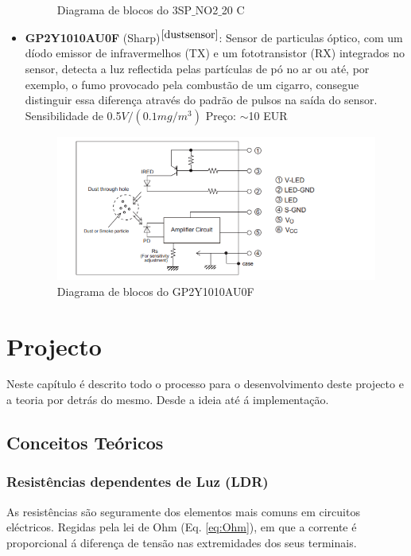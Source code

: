 \documentclass[12pt]{article}
\begin{document}
\begin{itemize}
\begin{figure}[H]
        \caption{Diagrama de blocos do 3SP$\_$NO2$\_$20 C}
    \end{figure}
    \item \textbf{GP2Y1010AU0F} (Sharp)$^{\cite{dustsensor}}$: Sensor de particulas óptico, com um díodo emissor de infravermelhos (TX) e um fototransistor (RX) integrados no sensor, detecta a luz reflectida pelas partículas de pó no ar ou até, por exemplo, o fumo provocado pela combustão de um cigarro, consegue distinguir essa diferença através do padrão de pulsos na saída do sensor. Sensibilidade de 0.5$V/(0.1mg/m^3)$ Preço: $\sim$10 EUR
    \begin{figure}[H]
        \centering
        \includegraphics[width=0.6\linewidth]{imgs/dust.png}
        \caption{Diagrama de blocos do GP2Y1010AU0F}
    \end{figure}
\end{itemize}


\section{Projecto}

\par Neste capítulo é descrito todo o processo para o desenvolvimento deste projecto e a teoria por detrás do mesmo. Desde a ideia até á implementação.

\subsection{Conceitos Teóricos}
\subsubsection{Resistências dependentes de Luz (LDR)}

\par As resistências são seguramente dos elementos mais comuns em circuitos eléctricos. Regidas pela lei de Ohm (Eq. \ref{eq:Ohm}), em que a corrente é proporcional á diferença de tensão nas extremidades dos seus terminais. 
\end{document}
